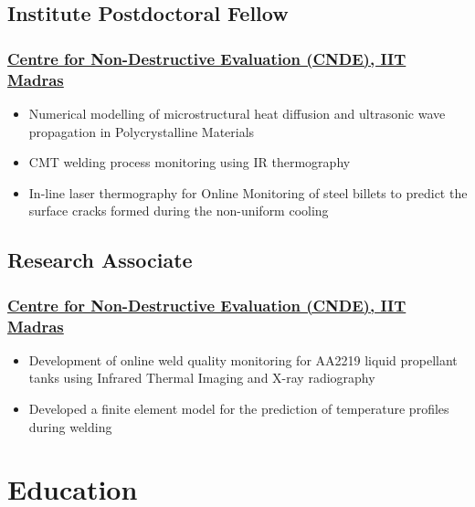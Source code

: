 \documentclass{my_cv}%
\begin{document}
\subsection{Institute Postdoctoral Fellow}
\subsubsection{\href{https://www.cnde.in/}{Centre for Non-Destructive Evaluation (CNDE), IIT Madras}}
\begin{itemize}[leftmargin=0.15in]
\setlength\itemsep{-0.1em}
\color{mygray}
\item Numerical modelling of microstructural heat diffusion and ultrasonic wave propagation in Polycrystalline Materials
\item CMT welding process monitoring using IR thermography 
\item In-line laser thermography for Online Monitoring of steel billets to predict the surface cracks formed during the non-uniform cooling 
\end{itemize}
{\color{mygray1} \hdashrule[0.1ex]{18.8cm}{0.2mm}{1mm}}
\subsection{Research Associate}
\subsubsection{\href{https://www.cnde.in/}{Centre for Non-Destructive Evaluation (CNDE), IIT Madras}}
\begin{itemize}[leftmargin=0.15in]
\setlength\itemsep{-0.1em}
\color{mygray}
\item Development of online weld quality monitoring for AA2219 liquid propellant tanks using Infrared Thermal Imaging and X-ray radiography 
\item Developed a finite element model for the prediction of temperature profiles during welding
\end{itemize}
\section{Education}
\vspace{2em}
\end{document}

